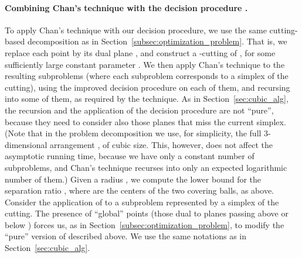 \documentclass[a4paper,12pt]{article}
\begin{document}
\paragraph{Combining Chan's technique with the decision procedure .}
To apply Chan's technique with our decision procedure, we use the
same cutting-based decomposition as in
Section~\ref{subsec:optimization_problem}. That is, we replace each
point  by its dual plane , and construct a
-cutting of , for some sufficiently large
constant parameter . We then apply Chan's technique to
the resulting subproblems (where each subproblem corresponds to a
simplex  of the cutting), using the improved decision
procedure  on each of them, and recursing into some of them,
as required by the technique. As in Section~\ref{sec:cubic_alg}, the
recursion and the application of the decision procedure are not
``pure'', because they need to consider also those planes that miss
the current simplex. (Note that in the problem decomposition we use,
for simplicity, the full 3-dimensional arrangement , of
cubic size. This, however, does not affect the asymptotic running
time, because we have only a constant number of subproblems, and
Chan's technique recurses into only an expected logarithmic number
of them.) Given a radius , we compute the lower bound  for the separation ratio
, where  are the centers of the two
covering balls, as above. Consider the application of  to a
subproblem represented by a simplex  of the cutting. The
presence of ``global'' points (those dual to planes passing above or
below ) forces us, as in
Section~\ref{subsec:optimization_problem}, to modify the ``pure''
version of  described above. We use the same notations as in
Section~\ref{sec:cubic_alg}.
\end{document}
